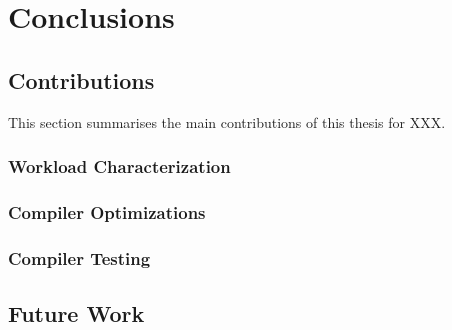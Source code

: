 \chapter{Conclusions}

\lipsum[1-3]

\section{Contributions}

This section summarises the main contributions of this thesis for XXX.

\subsection{Workload Characterization}

\subsection{Compiler Optimizations}

\subsection{Compiler Testing}

\section{Future Work}